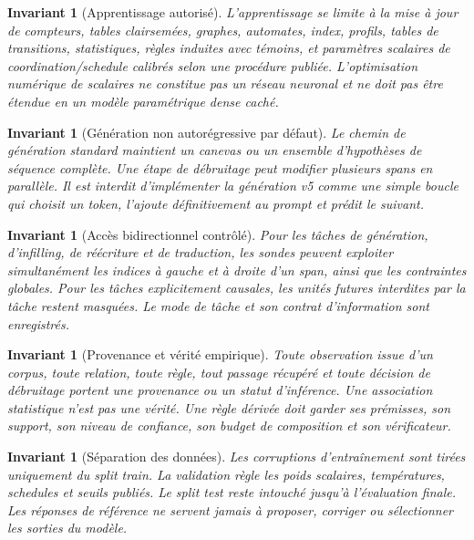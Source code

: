 \documentclass[11pt,a4paper,oneside]{report}
\newtheorem{invariant}[definition]{Invariant}
\begin{document}
\begin{invariant}[Apprentissage autorisé]
L'apprentissage se limite à la mise à jour de compteurs, tables clairsemées, graphes, automates, index, profils, tables de transitions, statistiques, règles induites avec témoins, et paramètres scalaires de coordination/schedule calibrés selon une procédure publiée. L'optimisation numérique de scalaires ne constitue pas un réseau neuronal et ne doit pas être étendue en un modèle paramétrique dense caché.
\end{invariant}

\begin{invariant}[Génération non autorégressive par défaut]
Le chemin de génération standard maintient un canevas ou un ensemble d'hypothèses de séquence complète. Une étape de débruitage peut modifier plusieurs spans en parallèle. Il est interdit d'implémenter la génération v5 comme une simple boucle qui choisit un token, l'ajoute définitivement au prompt et prédit le suivant.
\end{invariant}

\begin{invariant}[Accès bidirectionnel contrôlé]
Pour les tâches de génération, d'infilling, de réécriture et de traduction, les sondes peuvent exploiter simultanément les indices à gauche et à droite d'un span, ainsi que les contraintes globales. Pour les tâches explicitement causales, les unités futures interdites par la tâche restent masquées. Le mode de tâche et son contrat d'information sont enregistrés.
\end{invariant}

\begin{invariant}[Provenance et vérité empirique]
Toute observation issue d'un corpus, toute relation, toute règle, tout passage récupéré et toute décision de débruitage portent une provenance ou un statut d'inférence. Une association statistique n'est pas une vérité. Une règle dérivée doit garder ses prémisses, son support, son niveau de confiance, son budget de composition et son vérificateur.
\end{invariant}

\begin{invariant}[Séparation des données]
Les corruptions d'entraînement sont tirées uniquement du split train. La validation règle les poids scalaires, températures, schedules et seuils publiés. Le split test reste intouché jusqu'à l'évaluation finale. Les réponses de référence ne servent jamais à proposer, corriger ou sélectionner les sorties du modèle.
\end{invariant}
\end{document}
